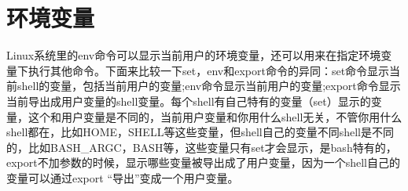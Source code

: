 \section{环境变量}
Linux系统里的env命令可以显示当前用户的环境变量，还可以用来在指定环境变量下执行其他命令。下面来比较一下set，env和export命令的异同：set命令显示当前shell的变量，包括当前用户的变量;env命令显示当前用户的变量;export命令显示当前导出成用户变量的shell变量。每个shell有自己特有的变量（set）显示的变量，这个和用户变量是不同的，当前用户变量和你用什么shell无关，不管你用什么shell都在，比如HOME，SHELL等这些变量，但shell自己的变量不同shell是不同的，比如BASH\_ARGC，BASH等，这些变量只有set才会显示，是bash特有的，export不加参数的时候，显示哪些变量被导出成了用户变量，因为一个shell自己的变量可以通过export “导出”变成一个用户变量。
